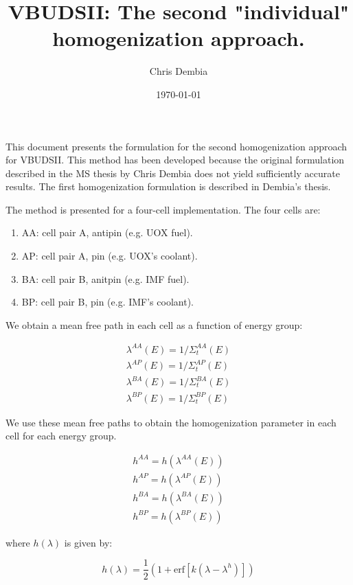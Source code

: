 \documentclass[letterpaper,12pt]{article}
\begin{document}
\title{VBUDSII: The second "individual" homogenization approach.}
\author{Chris Dembia}
\date{\today}

\maketitle

This document presents the formulation for the second homogenization approach
for VBUDSII. This method has been developed because the original formulation
described in the MS thesis by Chris Dembia does not yield sufficiently
accurate results. The first homogenization formulation is described in Dembia's
thesis.

The method is presented for a four-cell implementation. The four cells are:

\begin{enumerate}
\item AA: cell pair A, antipin (e.g. UOX fuel).
\item AP: cell pair A, pin (e.g. UOX's coolant).
\item BA: cell pair B, anitpin (e.g. IMF fuel).
\item BP: cell pair B, pin (e.g. IMF's coolant).
\end{enumerate}

We obtain a mean free path in each cell as a function of energy group:

\begin{align}
\lambda^{AA}(E) = 1/\Sigma_{t}^{AA}(E) \\
\lambda^{AP}(E) = 1/\Sigma_{t}^{AP}(E) \\
\lambda^{BA}(E) = 1/\Sigma_{t}^{BA}(E) \\
\lambda^{BP}(E) = 1/\Sigma_{t}^{BP}(E)
\end{align}

We use these mean free paths to obtain the homogenization parameter in each
cell for each energy group.

\begin{align}
    h^{AA} = h(\lambda^{AA}(E)) \\
    h^{AP} = h(\lambda^{AP}(E))  \\
    h^{BA} = h(\lambda^{BA}(E))  \\
    h^{BP} = h(\lambda^{BP}(E)) 
\end{align}

where $h(\lambda)$ is given by:

\begin{equation}
    h(\lambda) = \frac{1}{2}\left(1 + \mbox{erf}{[k(\lambda -
    \lambda^h)]}\right)
\end{equation}
\end{document}
